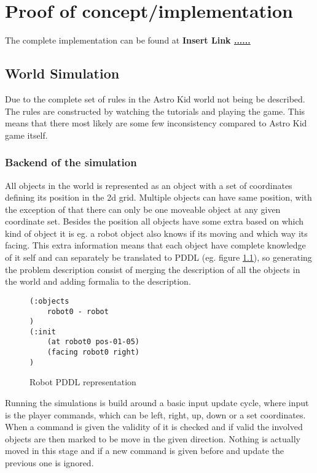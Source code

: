 \chapter{Proof of concept/implementation}
The complete implementation can be found at \textbf{\huge Insert Link \url{......}}
\section{World Simulation}
	Due to the complete set of rules in the Astro Kid world not being be described. The rules are constructed by watching the tutorials and playing the game. This means that there most likely are some few inconsistency compared to Astro Kid game itself.


	\subsection{Backend of the simulation}
	All objects in the world is represented as an object with a set of coordinates defining its position in the 2d grid. Multiple objects can have same position, with the exception of that there can only be one moveable object at any given coordinate set. Besides the position all objects have some extra based on which kind of object it is eg. a robot object also knows if its moving and which way its facing. This extra information means that each object have complete knowledge of it self and can separately be translated to PDDL (eg. figure \ref{robotpddl}), so generating the problem description consist of merging the description of all the objects  in the world and adding formalia to the description.
	\begin{figure}
	\caption{Robot PDDL representation}
	\label{robotpddl}
	\begin{lstlisting}
(:objects
	robot0 - robot
)
(:init
	(at robot0 pos-01-05)
	(facing robot0 right)
)
	\end{lstlisting}
	
		\end{figure}
	Running the simulations is build around a basic input update cycle, where input is the player commands, which can be left, right, up, down or a set coordinates. When a command is given the validity of it is checked and if valid the involved objects are then marked to be move in the given direction. Nothing is actually moved in this stage and if a new command is given before and update the previous one is ignored.
	
